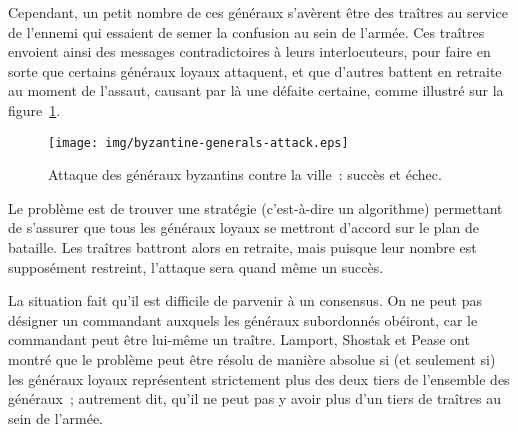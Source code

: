 Cependant, un petit nombre de ces généraux s'avèrent être des traîtres au service de l'ennemi qui essaient de semer la confusion au sein de l'armée. Ces traîtres envoient ainsi des messages contradictoires à leurs interlocuteurs, pour faire en sorte que certains généraux loyaux attaquent, et que d'autres battent en retraite au moment de l'assaut, causant par là une défaite certaine, comme illustré sur la figure~\ref{fig:byzantine-generals-attack}.

\begin{figure}[h]
  \centering
  \texttt{[image: img/byzantine-generals-attack.eps]}
  \caption{Attaque des généraux byzantins contre la ville~: succès et échec.}
  \label{fig:byzantine-generals-attack}
\end{figure}

Le problème est de trouver une stratégie (c'est-à-dire un algorithme) permettant de s'assurer que tous les généraux loyaux se mettront d'accord sur le plan de bataille. Les traîtres battront alors en retraite, mais puisque leur nombre est supposément restreint, l'attaque sera quand même un succès.

La situation fait qu'il est difficile de parvenir à un consensus. On ne peut pas désigner un commandant auxquels les généraux subordonnés obéiront, car le commandant peut être lui-même un traître. Lamport, Shostak et Pease ont montré que le problème peut être résolu de manière absolue si (et seulement si) les généraux loyaux représentent strictement plus des deux tiers de l'ensemble des généraux~; autrement dit, qu'il ne peut pas y avoir plus d'un tiers de traîtres au sein de l'armée.


